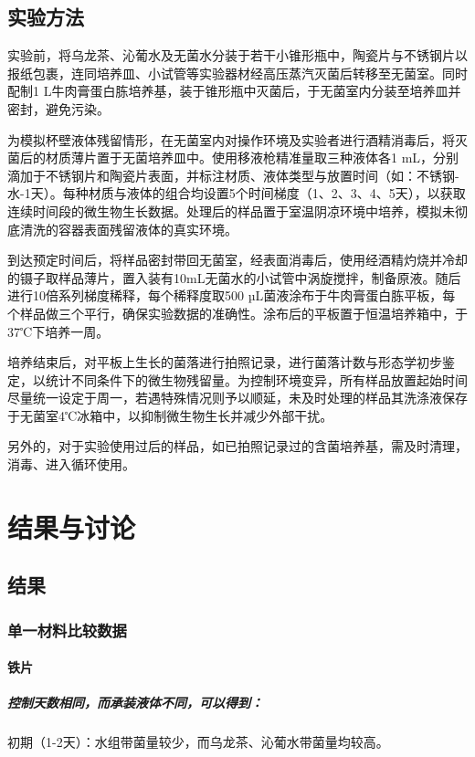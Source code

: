 \documentclass[12pt,a4paper]{article}
\begin{document}
\subsection{实验方法}
实验前，将乌龙茶、沁葡水及无菌水分装于若干小锥形瓶中，陶瓷片与不锈钢片以报纸包裹，连同培养皿、小试管等实验器材经高压蒸汽灭菌后转移至无菌室。同时配制1 L牛肉膏蛋白胨培养基，装于锥形瓶中灭菌后，于无菌室内分装至培养皿并密封，避免污染。

为模拟杯壁液体残留情形，在无菌室内对操作环境及实验者进行酒精消毒后，将灭菌后的材质薄片置于无菌培养皿中。使用移液枪精准量取三种液体各1 mL，分别滴加于不锈钢片和陶瓷片表面，并标注材质、液体类型与放置时间（如：不锈钢-水-1天）。每种材质与液体的组合均设置5个时间梯度（1、2、3、4、5天），以获取连续时间段的微生物生长数据。处理后的样品置于室温阴凉环境中培养，模拟未彻底清洗的容器表面残留液体的真实环境。

到达预定时间后，将样品密封带回无菌室，经表面消毒后，使用经酒精灼烧并冷却的镊子取样品薄片，置入装有10mL无菌水的小试管中涡旋搅拌，制备原液。随后进行10倍系列梯度稀释，每个稀释度取500 µL菌液涂布于牛肉膏蛋白胨平板，每个样品做三个平行，确保实验数据的准确性。涂布后的平板置于恒温培养箱中，于37℃下培养一周。

培养结束后，对平板上生长的菌落进行拍照记录，进行菌落计数与形态学初步鉴定，以统计不同条件下的微生物残留量。为控制环境变异，所有样品放置起始时间尽量统一设定于周一，若遇特殊情况则予以顺延，未及时处理的样品其洗涤液保存于无菌室4℃冰箱中，以抑制微生物生长并减少外部干扰。

另外的，对于实验使用过后的样品，如已拍照记录过的含菌培养基，需及时清理，消毒、进入循环使用。



\section{结果与讨论}
\subsection{结果}
\subsubsection{单一材料比较数据}
\paragraph{铁片}
\subparagraph{控制天数相同，而承装液体不同，可以得到：}
 
初期（1-2天）：水组带菌量较少，而乌龙茶、沁葡水带菌量均较高。
\end{document}
